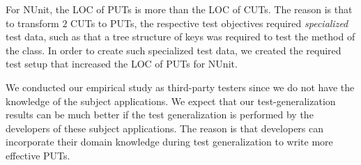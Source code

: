For NUnit, the LOC of PUTs is more than the LOC of CUTs. The reason is that to transform $2$ CUTs to PUTs, the respective test objectives required \textit{specialized} test data, such as that a tree structure of keys was required to test the  method of the  class. In order to create such specialized test data, we created the required test setup that increased the LOC of PUTs for NUnit.

We conducted our empirical study as third-party testers since we do not have the knowledge of the subject applications. We expect that our test-generalization results can be much better if the test generalization is performed by the developers of these subject applications. The reason is that developers can incorporate their domain knowledge during test generalization to write more effective PUTs.



